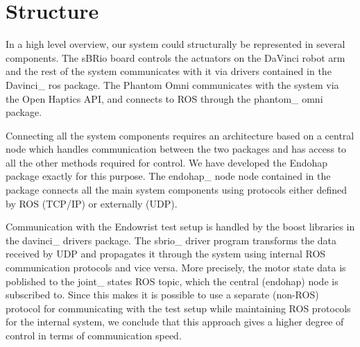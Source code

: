 


\section*{Structure}

In a high level overview, our system could structurally be represented in several components.
The sBRio board controls the actuators on the DaVinci robot arm and the rest of the system communicates with it via drivers contained in the Davinci\_ ros package. The Phantom Omni communicates with the system via the Open Haptics API, and connects to ROS through the phantom\_ omni package.

Connecting all the system components requires an architecture based on a central node which handles communication between the two packages and has access to all the other methods required for control.
We have developed the Endohap package exactly for this purpose.
The endohap\_ node node contained in the package connects all the main system components using protocols either defined by ROS (TCP/IP) or externally (UDP). 

Communication with the Endowrist test setup is handled by the boost libraries in the davinci\_ drivers package. 
The sbrio\_ driver program transforms the data received by UDP and propagates it through the system using internal ROS communication protocols and vice versa. 
More precisely, the motor state data is poblished to the joint\_ states ROS topic, which the central (endohap) node is subscribed to.
Since this makes it is possible to use a separate (non-ROS) protocol for communicating with the test setup while maintaining ROS protocols for the internal system, we conclude that this approach gives a higher degree of control in terms of communication speed.

